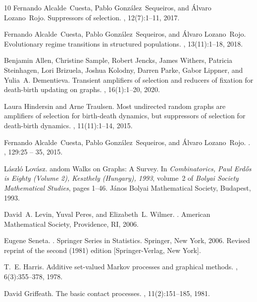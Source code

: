 \documentclass[a4paper,english,10pt]{amsart}
\theoremstyle{definition}
\numberwithin{equation}{section}
\begin{document}
\begin{thebibliography}{10}
Fernando Alcalde~Cuesta, Pablo Gonz\'alez~Sequeiros, and \'Alvaro Lozano~Rojo.
\newblock Suppressors of selection.
, 12(7):1--11, 2017.

Fernando Alcalde~Cuesta, Pablo Gonz\'alez~Sequeiros, and {\'A}lvaro
  Lozano~Rojo.
\newblock Evolutionary regime transitions in structured populations.
, 13(11):1--18, 2018.

Benjamin Allen, Christine Sample, Robert Jencks, James Withers, Patricia
  Steinhagen, Lori Brizuela, Joshua Kolodny, Darren Parke, Gabor Lippner, and
  Yulia~A. Dementieva.
\newblock Transient amplifiers of selection and reducers of fixation for
  death-birth updating on graphs.
, 16(1):1--20, 2020.

Laura Hindersin and Arne Traulsen.
\newblock Most undirected random graphs are amplifiers of selection for
  birth-death dynamics, but suppressors of selection for death-birth dynamics.
, 11(11):1--14, 2015.

Fernando Alcalde~Cuesta, Pablo Gonz{\'a}lez~Sequeiros, and {\'A}lvaro
  Lozano~Rojo.
.
, 129:25 -- 35, 2015.

László Lov\'asz.
andom {W}alks on {G}raphs: {A} {S}urvey.
\newblock In {\em Combinatorics, Paul Erd\H{o}s is Eighty (Volume 2), Keszthely
  (Hungary), 1993}, volume~2 of {\em Bolyai Society Mathematical Studies},
  pages 1--46. J\'anos Bolyai Mathematical Society, Budapest, 1993.

David~A. Levin, Yuval Peres, and Elizabeth~L. Wilmer.
.
\newblock American Mathematical Society, Providence, RI, 2006.

Eugene Seneta.
.
\newblock Springer Series in Statistics. Springer, New York, 2006.
\newblock Revised reprint of the second (1981) edition [Springer-Verlag, New
  York].

T.~E. Harris.
\newblock Additive set-valued {M}arkov processes and graphical methods.
, 6(3):355--378, 1978.

David Griffeath.
\newblock The basic contact processes.
, 11(2):151--185, 1981.


\end{thebibliography}
\end{document}
